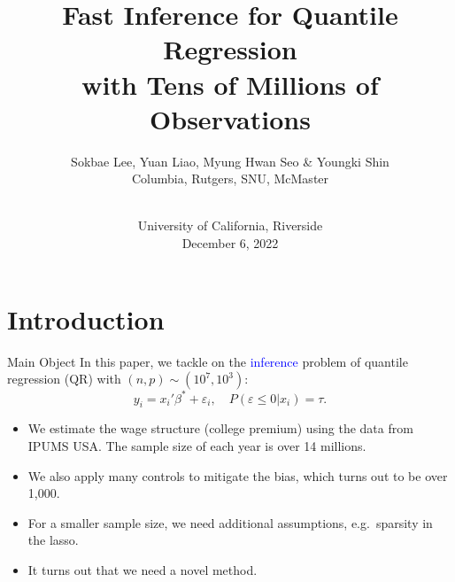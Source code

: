 \documentclass[beamer, t]{beamer}
\newcommand{\tcb}{\textcolor{blue}}
\begin{document}
\title{Fast Inference for Quantile Regression \\ 
with Tens of Millions of Observations}
\author[Lee, Liao, Seo \& Shin]{Sokbae Lee, Yuan Liao, Myung Hwan Seo \& Youngki Shin \\
\vskip5pt
\tiny Columbia, Rutgers, SNU, McMaster}
\date{\\
University of California, Riverside\\
December 6, 2022}
\maketitle







\section{Introduction}


\begin{frame}{Main Object}
In this paper, we tackle on the \tcb{inference} problem of quantile regression (QR) with $(n,p)\sim(10^7,10^3)$:
		$$
		y_i = x_i'\beta^*+ \varepsilon_i,\quad P(\varepsilon\leq 0|x_i)= \tau.
		$$

	\begin{itemize}

		\item We estimate the wage structure (college premium) using the data from IPUMS USA. The sample size of each year is over 14 millions. 
		
		\item We also apply many controls to mitigate the bias, which turns out to be over 1,000. 
		
		\item For a smaller sample size, we need additional assumptions, e.g.\ sparsity in the lasso. 
		
		\item It turns out that we need a novel method.
		
	\end{itemize}
	
\end{frame}
\end{document}
